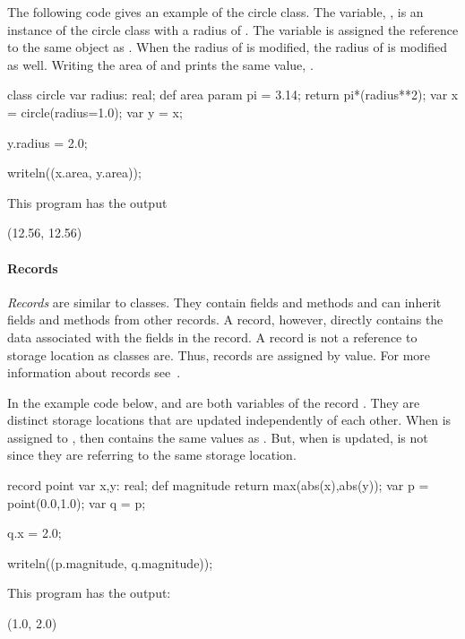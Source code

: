 \begin{example}
The following code gives an example of the circle class.  
The variable, , is an instance of the circle class with
a radius of .  The variable  is assigned the 
reference to the same object as .  When the radius of  is
modified, the radius of  is modified as well.  Writing the area
of  and  prints the same value, .
\begin{chapel}
class circle {
  var radius: real;
  def area {
    param pi = 3.14;
    return pi*(radius**2);
  }
}
var x = circle(radius=1.0);
var y = x;

y.radius = 2.0;

writeln((x.area, y.area));
\end{chapel}

This program has the output
\begin{commandline}
(12.56, 12.56)
\end{commandline}
\end{example}

\paragraph{Records}
\emph{Records} are similar to classes.  They contain fields and methods
and can inherit fields and methods from other records.  A record,
however, directly contains the data associated with the fields
in the record.  A record is not a reference to storage location as
classes are.  Thus, records are assigned by value.  For more information
about records see~.

\begin{example}
In the example code below,  and  are both
variables of the record .  They are distinct storage
locations that are updated independently of each other.
When  is assigned to ,  then contains the
same values as .  But, when  is updated, 
is not since they are referring to the same storage location.

\begin{chapel}
record point {
  var x,y: real;
  def magnitude {
    return max(abs(x),abs(y));
  }
}
var p = point(0.0,1.0);
var q = p;

q.x = 2.0;

writeln((p.magnitude, q.magnitude));
\end{chapel}

This program has the output:

\begin{commandline}
(1.0, 2.0)
\end{commandline}
\end{example}

